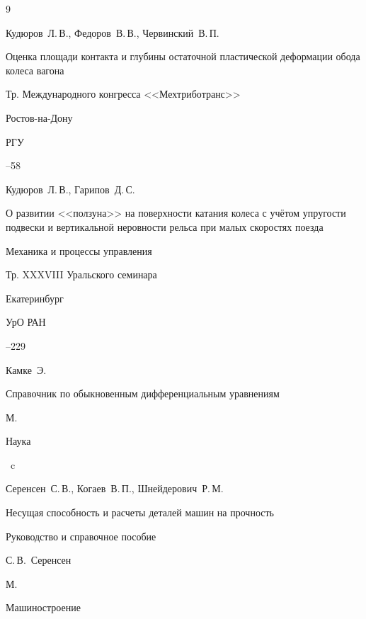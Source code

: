 \begin{thebibliography}{9}




\by Кудюров~Л.\,В., Федоров~В.\,В., Червинский~В.\,П.

\paper Оценка площади контакта и глубины остаточной пластической деформации обода колеса вагона

\inbook Тр. Международного конгресса <<Мехтриботранс>>

\publaddr Ростов-на-Дону

\publ РГУ


--58




\by Кудюров~Л.\,В., Гарипов~Д.\,С.

\paper О развитии <<ползуна>> на поверхности катания колеса с учётом упругости подвески и вертикальной неровности рельса при малых скоростях поезда

\inbook Механика и процессы управления

\bookinfo Тр. XXXVIII Уральского семинара

\publaddr Екатеринбург

\publ УрО РАН



--229




\by Камке~Э.

\book Справочник по обыкновенным дифференциальным уравнениям

\publaddr М.

\publ Наука


~c




\by Серенсен~С.\,В., Когаев~В.\,П., Шнейдерович~Р.\,М.

\book Несущая способность и расчеты деталей машин на прочность

\bookinfo Руководство и справочное пособие

\ed С.\,В.~Серенсен

\publaddr М.

\publ Машиностроение


\end{thebibliography}
